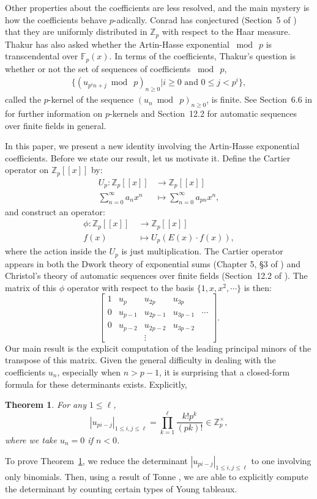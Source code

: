 \documentclass[letterpaper,oneside, 10pt]{amsart}
\newtheorem{theorem}[thm]{Theorem}
\theoremstyle{definition}
\numberwithin{equation}{section}
\newcommand{\Fp}{\mathbb{F}_p}
\newcommand{\Zp}{\mathbb{Z}_p}
\newcommand{\Zptimes}{\mathbb{Z}_p^\times}
\begin{document}
Other properties about the coefficients are less resolved, and the main mystery is how the coefficients behave $p$-adically.
Conrad has  conjectured (Section~5 of \cite{KConrad}) that they are uniformly distributed in $\Zp$ with respect to the Haar measure.  Thakur \cite{Thakur} has also asked whether the Artin-Hasse exponential $\bmod\ p$ is transcendental over $\Fp(x)$.  In terms of the coefficients, Thakur's question is whether or not the set of sequences of coefficients $\bmod\ p$,  
\begin{align*}\label{line:pkernel}
	\{({u}_{p^in+j}\bmod\ p)_{n\geq 0} | i\geq 0\textrm{ and } 0\leq j<p^i\},
\end{align*}
called the $p$-kernel of the sequence $(u_n\bmod\ p)_{n\geq 0}$, is finite.  See Section~6.6 in \cite{Allouche} for further information on $p$-kernels and Section~12.2 for automatic sequences over finite fields in general.


In this paper, we present a new identity involving the Artin-Hasse exponential coefficients.  Before we state our result,  let us motivate it.  Define the Cartier operator on $\Zp[[x]]$ by:
\begin{align*}
	U_p: \Zp[[x]] &\to \Zp[[x]]\\
	\sum_{n=0}^\infty a_nx^n &\mapsto \sum_{n=0}^\infty a_{pn}x^n,
\end{align*}
and construct an operator:
\begin{align*}
	\phi: \Zp[[x]]\ &\to \Zp[[x]] \\
		f(x) &\mapsto U_p(E(x)\cdot f(x)),
\end{align*}
where the action inside the $U_p$ is just multiplication.  The Cartier operator appears in both the Dwork theory of exponential sums (Chapter 5, \S 3 of \cite{Koblitz}) and Christol's theory of automatic sequences over finite fields  (Section~12.2 of \cite{Allouche}).  The matrix of this $\phi$ operator with respect to the basis $\{1, x, x^2, \cdots\}$ is then:
\[	
	\begin{bmatrix}
		1 & u_p & u_{2p} & u_{3p} &  \\
		0 & u_{p-1} & u_{2p-1} & u_{3p-1} & \cdots \\
		0 & u_{p-2} & u_{2p-2} & u_{3p-2} &  \\
		 & & \vdots & 
	\end{bmatrix}.
\] 
Our main result is the explicit computation of the leading principal minors of the transpose of this matrix.   Given the general difficulty in dealing with the coefficients $u_n$, especially when $n>p-1$,  it is surprising that a closed-form formula for these determinants exists. Explicitly, 
\begin{theorem}\label{thm:main}
For any $1\leq \ell$,
\[
	|u_{pi-j}|_{1\leq i,j\leq \ell} = \prod_{k=1}^\ell\frac{k!p^k}{(pk)!}\in\Zptimes,
\]
where we take $u_n=0$ if $n<0$.
\end{theorem}
To prove Theorem~\ref{thm:main}, we reduce the determinant $|u_{pi-j}|_{1\leq i,j\leq \ell}$ to one involving only binomials. Then, using a result of Tonne \cite{Tonne}, we are able to explicitly compute the determinant by counting certain types of Young tableaux. 
\end{document}

